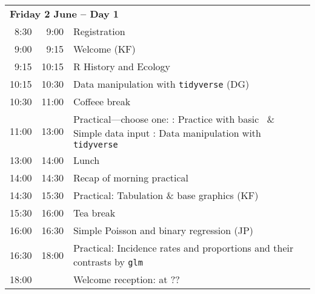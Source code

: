 \noindent
\begin{tabular}{r@{ -- }rp{13cm}}
\multicolumn{3}{l}{\bf Friday 2 June -- Day 1} \\
 8:30 &  9:00 & Registration \\
 9:00 &  9:15 & Welcome (KF) \\
 9:15 & 10:15 & R History and Ecology\\%
10:15 & 10:30 & Data manipulation with \texttt{tidyverse} (DG) \\
10:30 & 11:00 & Coffeee break \\
11:00 & 13:00 & Practical---choose one: \newline
                1: Practice with basic \R\ \& Simple data input \newline
                2: Data manipulation with \texttt{tidyverse} \\

  
13:00 & 14:00 & Lunch \\
14:00 & 14:30 & Recap of morning practical \\
14:30 & 15:30 & Practical: Tabulation \& base graphics (KF)\\ %
15:30 & 16:00 & Tea break\\
16:00 & 16:30 & Simple Poisson and binary regression (JP)\\ %
16:30 & 18:00 & Practical: Incidence rates and proportions and their contrasts by \texttt{glm} \\ 
18:00 &       & Welcome reception: at ?? \\[1em]
\end{tabular}

